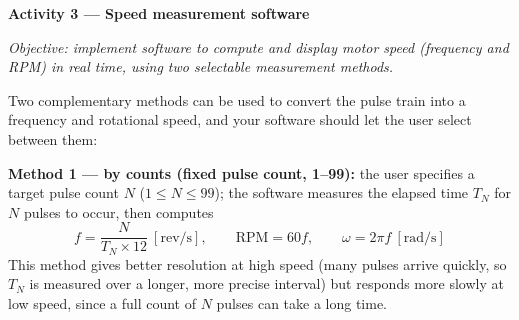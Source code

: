 \begin{procedure}
  \begin{boxedfigure}
    \centering
    \label{fig:exp7-signalpath}
  \end{boxedfigure}
  \vspace*{1.5em}

  \textbf{Activity 3 --- Speed measurement software}\vspace{2pt}

  \textit{Objective: implement software to compute and display motor speed (frequency and RPM) in real time, using two selectable measurement methods.}

  Two complementary methods can be used to convert the pulse train into a frequency and rotational speed, and your software should let the user select between them:
  \vspace*{1.5em}

  \textbf{Method 1 --- by counts (fixed pulse count, 1--99):} the user specifies a target pulse count $N$ ($1 \leq N \leq 99$); the software measures the elapsed time $T_N$ for $N$ pulses to occur, then computes
  \[
    f = \frac{N}{T_N \times 12} \ \left[\text{rev/s}\right], \qquad
    \text{RPM} = 60f, \qquad
    \omega = 2\pi f \ \left[\text{rad/s}\right]
  \]
  This method gives better resolution at high speed (many pulses arrive quickly, so $T_N$ is measured over a longer, more precise interval) but responds more slowly at low speed, since a full count of $N$ pulses can take a long time.
  \vspace*{1.5em}


\end{procedure}
